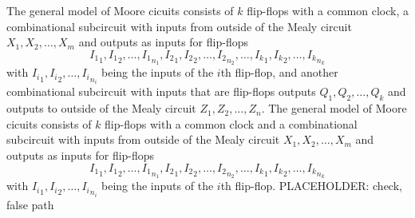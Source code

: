 \documentclass[a4paper,12pt]{report}
\begin{document}
The general model of Moore cicuits consists of $k$ flip-flops with a common clock, a combinational subcircuit with inputs from outside of the Mealy circuit $X_1,X_2,\ldots,X_m$ and outputs as inputs for flip-flops
\[{I_1}_1,{I_1}_2,\ldots,{I_1}_{n_1},{I_2}_1,{I_2}_2,\ldots,{I_2}_{n_2},\ldots,{I_k}_1,{I_k}_2,\ldots,{I_k}_{n_k}\]
with ${I_i}_1,{I_i}_2,\ldots,{I_i}_{n_i}$ being the inputs of the $i$th flip-flop, and another combinational subcircuit with inputs that are flip-flops outputs $Q_1,Q_2,\ldots,Q_k$ and outputs to outside of the Mealy circuit $Z_1,Z_2,\ldots,Z_n$.
The general model of Moore cicuits consists of $k$ flip-flops with a common clock and a combinational subcircuit with inputs from outside of the Mealy circuit $X_1,X_2,\ldots,X_m$ and outputs as inputs for flip-flops
\[{I_1}_1,{I_1}_2,\ldots,{I_1}_{n_1},{I_2}_1,{I_2}_2,\ldots,{I_2}_{n_2},\ldots,{I_k}_1,{I_k}_2,\ldots,{I_k}_{n_k}\]
with ${I_i}_1,{I_i}_2,\ldots,{I_i}_{n_i}$ being the inputs of the $i$th flip-flop.
PLACEHOLDER: check, false path
\end{document}
